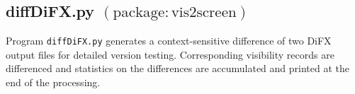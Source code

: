 %
%










\subsection{diffDiFX.py {\small $\mathrm{(package: vis2screen)}$}} \label{sec:diffDiFX} 

Program {\tt diffDiFX.py} generates a context-sensitive difference of two DiFX output files for detailed version testing.  Corresponding visibility records are differenced and statistics on the differences are accumulated and printed at the end of the processing.

